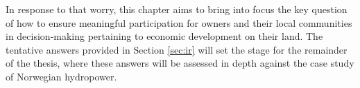 {%
%
%

In response to that worry, this chapter aims to bring into focus the key question of how to ensure meaningful participation for owners and their local communities in decision-making pertaining to economic development on their land. The tentative answers provided in Section \ref{sec:ir} will set the stage for the remainder of the thesis, where these answers will be assessed in depth against the case study of Norwegian hydropower.


}
